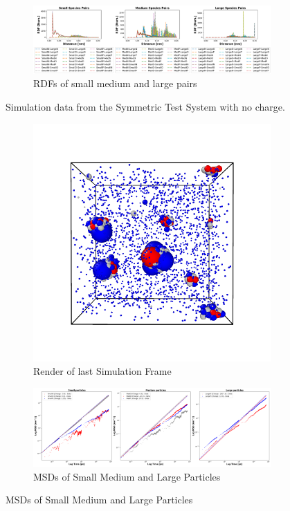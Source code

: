 \documentclass[draft, english]{volcanica-template}
\begin{document}
\begin{figure}[!htbp]
\begin{figure}[!htbp]
\centering
\includegraphics[width=0.7\linewidth]{files/Pairwise_RDFs_ij-496e4cab678e5269ed659c08237e9dd0.png}
\caption[]{RDFs of small medium and large pairs}
\label{Fig5_NoQSymTestSys-d}
\end{figure}
\caption[]{Simulation data from the Symmetric Test System with no charge.}
\label{Fig5_NoQSymTestSys-d}
\end{figure}

\begin{figure}[!htbp]
\centering
\begin{figure}[!htbp]
\centering
\includegraphics[width=0.7\linewidth]{files/LastRender-724ad6f5113736c16b46feb4f89aad8d.png}
\caption[]{Render of last Simulation Frame}
\label{Fig6_TestSys}
\end{figure}

\begin{figure}[!htbp]
\centering
\includegraphics[width=0.7\linewidth]{files/Combined_MSD-804edbab2e86e80aaa8f2986f74f0ffe.png}
\caption[]{MSDs of Small Medium and Large Particles}
\label{Fig6_TestSys-b}
\end{figure}


\end{figure}
\end{document}
